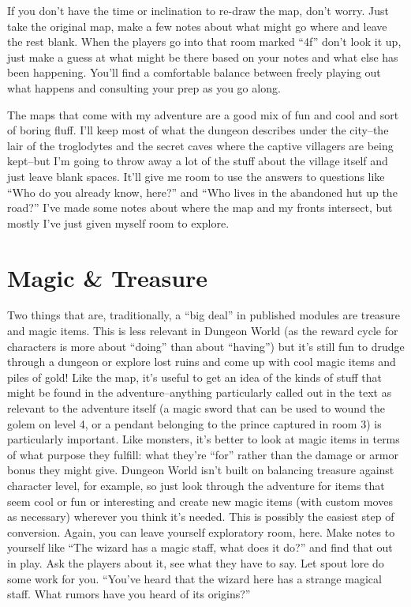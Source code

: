  If you don't have the time or inclination to re-draw the map, don't worry. Just take the original map, make a few notes about what might go where and leave the rest blank. When the players go into that room marked ``4f'' don't look it up, just make a guess at what might be there based on your notes and what else has been happening. You'll find a comfortable balance between freely playing out what happens and consulting your prep as you go along.


 The maps that come with my adventure are a good mix of fun and cool and sort of boring fluff. I'll keep most of what the dungeon describes under the city--the lair of the troglodytes and the secret caves where the captive villagers are being kept--but I'm going to throw away a lot of the stuff about the village itself and just leave blank spaces. It'll give me room to use the answers to questions like ``Who do you already know, here?'' and ``Who lives in the abandoned hut up the road?'' I've made some notes about where the map and my fronts intersect, but mostly I've just given myself room to explore.
\section*{Magic \& Treasure}


 Two things that are, traditionally, a ``big deal'' in published modules are treasure and magic items. This is less relevant in Dungeon World (as the reward cycle for characters is more about ``doing'' than about ``having'') but it's still fun to drudge through a dungeon or explore lost ruins and come up with cool magic items and piles of gold! Like the map, it's useful to get an idea of the kinds of stuff that might be found in the adventure--anything particularly called out in the text as relevant to the adventure itself (a magic sword that can be used to wound the golem on level 4, or a pendant belonging to the prince captured in room 3) is particularly important. Like monsters, it's better to look at magic items in terms of what purpose they fulfill: what they're ``for'' rather than the damage or armor bonus they might give. Dungeon World isn't built on balancing treasure against character level, for example, so just look through the adventure for items that seem cool or fun or interesting and create new magic items (with custom moves as necessary) wherever you think it's needed. This is possibly the easiest step of conversion. Again, you can leave yourself exploratory room, here. Make notes to yourself like ``The wizard has a magic staff, what does it do?'' and find that out in play. Ask the players about it, see what they have to say. Let spout lore do some work for you. ``You've heard that the wizard here has a strange magical staff. What rumors have you heard of its origins?''
